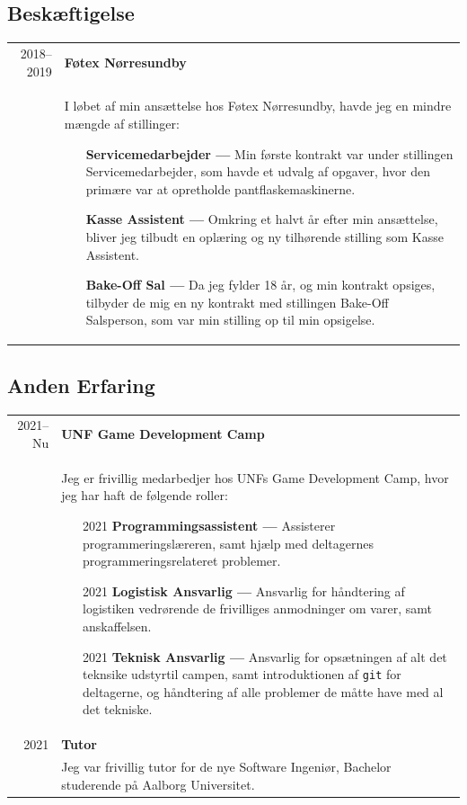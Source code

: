 \documentclass{article}
\begin{document}
    \subsection*{Beskæftigelse}
    \begin{tabular}{p{}|p{}}
        \multicolumn{1}{r|}{2018--2019} & \textbf{Føtex Nørresundby}\\
    &   I løbet af min ansættelse hos Føtex Nørresundby, havde jeg en mindre mængde af stillinger:
        \begin{itemize}\setlength\itemsep{0em}
            \item[] \textbf{Servicemedarbejder --- } Min første kontrakt var under stillingen 
                Servicemedarbejder, som havde et udvalg af opgaver, hvor den primære var at
                opretholde pantflaskemaskinerne.
            \item[] \textbf{Kasse Assistent --- } Omkring et halvt år efter min ansættelse, bliver
                jeg tilbudt en oplæring og ny tilhørende stilling som Kasse Assistent.
            \item[] \textbf{Bake-Off Sal --- } Da jeg fylder 18 år, og min kontrakt opsiges,
                tilbyder de mig en ny kontrakt med stillingen Bake-Off Salsperson, som var min stilling
                op til min opsigelse.
        \end{itemize}
    \end{tabular}

    \subsection*{Anden Erfaring}
    \begin{tabular}{p{}|p{}}
        \multicolumn{1}{r|}{2021--Nu} & \textbf{UNF Game Development Camp}\\
    &   Jeg er frivillig medarbedjer hos UNFs Game Development Camp, hvor jeg har haft de følgende roller:
        \begin{itemize}\setlength\itemsep{0em}
            \item[2021] \textbf{Programmingsassistent ---} Assisterer programmeringslæreren, samt
                hjælp med deltagernes programmeringsrelateret problemer.
            \item[2021] \textbf{Logistisk Ansvarlig ---} Ansvarlig for håndtering af logistiken
                vedrørende de frivilliges anmodninger om varer, samt anskaffelsen.
            \item[2021] \textbf{Teknisk Ansvarlig ---} Ansvarlig for opsætningen af alt det teknsike
                udstyrtil campen, samt introduktionen af \verb|git| for deltagerne, og håndtering
                af alle problemer de måtte have med al det tekniske.
        \end{itemize}
        \\
        \multicolumn{1}{r|}{2021} & \textbf{Tutor}\\
    &   Jeg var frivillig tutor for de nye Software Ingeniør, Bachelor studerende på Aalborg Universitet.
    \end{tabular}
\end{document}
